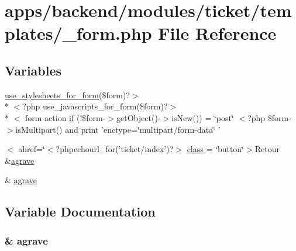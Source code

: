 \hypertarget{backend_2modules_2ticket_2templates_2__form_8php}{\section{apps/backend/modules/ticket/templates/\-\_\-form.php File Reference}
\label{backend_2modules_2ticket_2templates_2__form_8php}
}
\subsection*{Variables}
\begin{DoxyCompactItemize}
\item 
\hyperlink{live_2modules_2user_2templates_2__form_8php_a86bc4522fdbe625b07bc4a4d6eec3df7}{use\-\_\-stylesheets\-\_\-for\-\_\-form}(\$form)?$>$\\*
$<$?php use\-\_\-javascripts\-\_\-for\-\_\-form(\$form)?$>$\\*
$<$ form action \hyperlink{backend_2modules_2ticket_2templates_2__form_8php_abd1acf0179bbb4a56e04d4fccdbc121f}{if} (!\$form-\/$>$get\-Object()-\/$>$is\-New()) = \char`\"{}post\char`\"{} $<$?php \$form-\/$>$is\-Multipart() and print 'enctype=\char`\"{}multipart/form-\/data\char`\"{} '
\item 
$<$ ahref=\char`\"{}$<$?phpechourl\-\_\-for('ticket/index')?$>$ \hyperlink{backend_2modules_2ticket_2templates_2__form_8php_ae7a8d484327d64701c3d0b8c85754183}{class} = \char`\"{}button\char`\"{}$>$Retour \&\hyperlink{presse_2modules_2page_2templates_2concours_ouikos_success_8php_adcbedde811e3c81b65c252edf38caea2}{agrave}
\item 
\& \hyperlink{backend_2modules_2ticket_2templates_2__form_8php_a3f218257ebc2136049b9375c11d6aedf}{agrave}
\end{DoxyCompactItemize}


\subsection{Variable Documentation}
\hypertarget{backend_2modules_2ticket_2templates_2__form_8php_a3f218257ebc2136049b9375c11d6aedf}{
\subsubsection[{agrave}]{\setlength{\rightskip}{0pt plus 5cm}\& agrave}}\label{backend_2modules_2ticket_2templates_2__form_8php_a3f218257ebc2136049b9375c11d6aedf}



